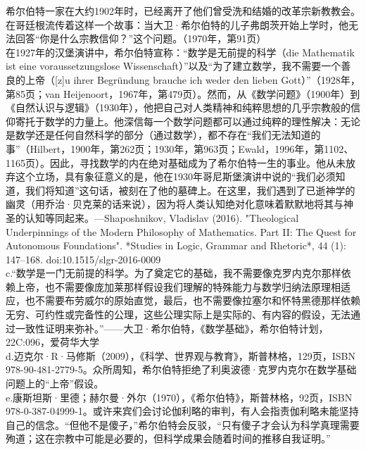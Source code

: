    希尔伯特一家在大约1902年时，已经离开了他们曾受洗和结婚的改革宗新教教会。在哥廷根流传着这样一个故事：当大卫·希尔伯特的儿子弗朗茨开始上学时，他无法回答“你是什么宗教信仰？”这个问题。（1970年，第91页）\\
在1927年的汉堡演讲中，希尔伯特宣称：“数学是无前提的科学（die Mathematik ist eine voraussetzungslose Wissenschaft）”以及“为了建立数学，我不需要一个善良的上帝（[z]u ihrer Begründung brauche ich weder den lieben Gott）”（1928年，第85页；van Heijenoort，1967年，第479页）。然而，从《数学问题》（1900年）到《自然认识与逻辑》（1930年），他把自己对人类精神和纯粹思想的几乎宗教般的信仰寄托于数学的力量上。他深信每一个数学问题都可以通过纯粹的理性解决：无论是数学还是任何自然科学的部分（通过数学），都不存在“我们无法知道的事”（Hilbert，1900年，第262页；1930年，第963页；Ewald，1996年，第1102、1165页）。因此，寻找数学的内在绝对基础成为了希尔伯特一生的事业。他从未放弃这个立场，具有象征意义的是，他在1930年哥尼斯堡演讲中说的“我们必须知道，我们将知道”这句话，被刻在了他的墓碑上。在这里，我们遇到了已逝神学的幽灵（用乔治·贝克莱的话来说），因为将人类认知绝对化意味着默默地将其与神圣的认知等同起来。—Shaposhnikov, Vladislav (2016). "Theological Underpinnings of the Modern Philosophy of Mathematics. Part II: The Quest for Autonomous Foundations". *Studies in Logic, Grammar and Rhetoric*, 44 (1): 147–168. doi:10.1515/slgr-2016-0009\\
c.“数学是一门无前提的科学。为了奠定它的基础，我不需要像克罗内克尔那样依赖上帝，也不需要像庞加莱那样假设我们理解的特殊能力与数学归纳法原理相适应，也不需要布劳威尔的原始直觉，最后，也不需要像拉塞尔和怀特黑德那样依赖无穷、可约性或完备性的公理，这些公理实际上是实际的、有内容的假设，无法通过一致性证明来弥补。”——大卫·希尔伯特，《数学基础》，希尔伯特计划，22C:096，爱荷华大学\\  
d.迈克尔·R·马修斯（2009），《科学、世界观与教育》，斯普林格，129页，ISBN 978-90-481-2779-5。众所周知，希尔伯特拒绝了利奥波德·克罗内克尔在数学基础问题上的“上帝”假设。\\  
e.康斯坦斯·里德；赫尔曼·外尔（1970），《希尔伯特》，斯普林格，92页，ISBN 978-0-387-04999-1。或许来宾们会讨论伽利略的审判，有人会指责伽利略未能坚持自己的信念。“但他不是傻子，”希尔伯特会反驳，“只有傻子才会认为科学真理需要殉道；这在宗教中可能是必要的，但科学成果会随着时间的推移自我证明。”\\
